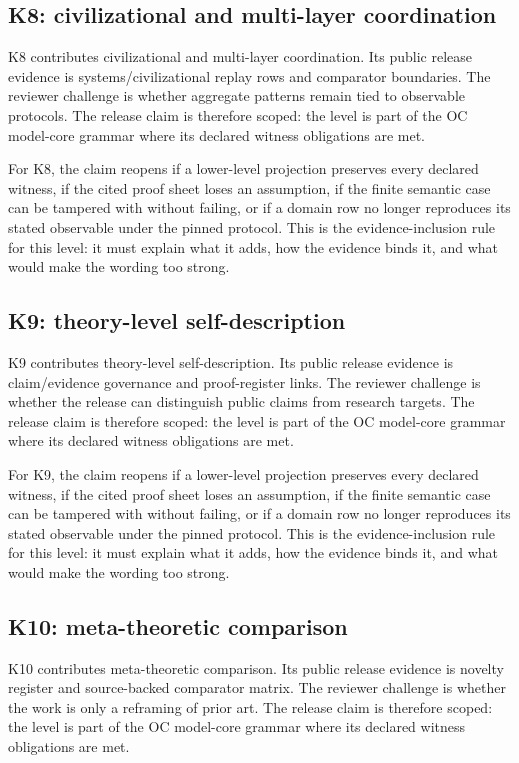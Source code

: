 \subsection{K8: civilizational and multi-layer coordination}

K8 contributes civilizational and multi-layer coordination. Its public release evidence is systems/civilizational replay rows and comparator boundaries. The reviewer challenge is whether aggregate patterns remain tied to observable protocols. The release claim is therefore scoped: the level is part of the OC model-core grammar where its declared witness obligations are met.


For K8, the claim reopens if a lower-level projection preserves every declared witness, if the cited proof sheet loses an assumption, if the finite semantic case can be tampered with without failing, or if a domain row no longer reproduces its stated observable under the pinned protocol. This is the evidence-inclusion rule for this level: it must explain what it adds, how the evidence binds it, and what would make the wording too strong.


\subsection{K9: theory-level self-description}

K9 contributes theory-level self-description. Its public release evidence is claim/evidence governance and proof-register links. The reviewer challenge is whether the release can distinguish public claims from research targets. The release claim is therefore scoped: the level is part of the OC model-core grammar where its declared witness obligations are met.


For K9, the claim reopens if a lower-level projection preserves every declared witness, if the cited proof sheet loses an assumption, if the finite semantic case can be tampered with without failing, or if a domain row no longer reproduces its stated observable under the pinned protocol. This is the evidence-inclusion rule for this level: it must explain what it adds, how the evidence binds it, and what would make the wording too strong.


\subsection{K10: meta-theoretic comparison}

K10 contributes meta-theoretic comparison. Its public release evidence is novelty register and source-backed comparator matrix. The reviewer challenge is whether the work is only a reframing of prior art. The release claim is therefore scoped: the level is part of the OC model-core grammar where its declared witness obligations are met.


